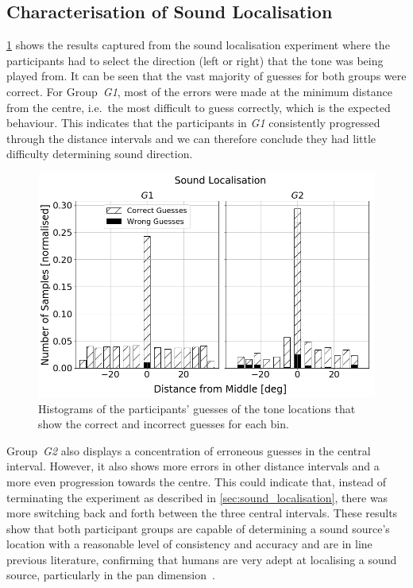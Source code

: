 \documentclass[acmsmall]{acmart}
\begin{document}
\subsection{Characterisation of Sound Localisation}

\cref{fig:sound-localisation} shows the results captured from the sound localisation experiment where the participants had to select the direction (left or right) that the tone was being played from. 
It can be seen that the vast majority of guesses for both groups were correct.
For Group~\textit{G1}, most of the errors were made at the minimum distance from the centre, i.e.\ the most difficult to guess correctly, which is the expected behaviour.
This indicates that the participants in \textit{G1} consistently progressed through the distance intervals and we can therefore conclude they had little difficulty determining sound direction.

\begin{figure}
  \centering
  \includegraphics[width=0.8\columnwidth]{figures/sound_localisation.png}
  \caption{Histograms of the participants' guesses of the tone locations that show the correct and incorrect guesses for each bin. }\label{fig:sound-localisation}
\end{figure}

Group~\textit{G2} also displays a concentration of erroneous guesses in the central interval.
However, it also shows more errors in other distance intervals and a more even progression towards the centre.
This could indicate that, instead of terminating the experiment as described in \cref{sec:sound_localisation}, there was more switching back and forth between the three central intervals. 
These results show that both participant groups are capable of determining a sound source's location with a reasonable level of consistency and accuracy and are in line previous literature, confirming that humans are very adept at localising a sound source, particularly in the pan dimension~\cite{wersenyi2003localization}. 
\end{document}
